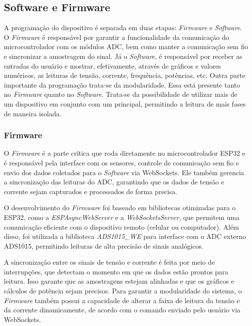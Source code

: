 \subsection{Software e Firmware}\label{softfirm}

A programação do dispositivo é separada em duas etapas: \textit{Firmware} e \textit{Software}. O \textit{Firmware} é responsável por garantir a funcionalidade da comunicação do microcontrolador com os módulos \gls{ADC}, bem como manter a comunicação sem fio e sincronizar a amostragem do sinal.
Já o \textit{Software}, é responsável por receber as entradas do usuário e mostrar, efetivamente, através de gráficos e valores numéricos, as leituras de tensão, corrente, frequência, potências, etc.
Outra parte importante da programação trata-se da modularidade. Essa está presente tanto no \textit{Firmware} quanto no \textit{Software}. Trata-se da possibilidade de utilizar mais de um dispositivo em conjunto com um principal, permitindo a leitura de mais fases de maneira isolada.

\subsubsection{Firmware}\label{firmw}

O \textit{Firmware} é a parte crítica que roda diretamente no microcontrolador ESP32 e é responsável pela interface com os sensores, controle de comunicação sem fio e envio dos dados coletados para o \textit{Software} via WebSockets. Ele também gerencia a sincronização das leituras do ADC, garantindo que os dados de tensão e corrente sejam capturados e processados de forma precisa.

O desenvolvimento do \textit{Firmware} foi baseado em bibliotecas otimizadas para o ESP32, como a \textit{ESPAsyncWebServer} e a \textit{WebSocketsServer}, que permitem uma comunicação eficiente com o dispositivo remoto (celular ou computador). Além disso, foi utilizada a biblioteca \textit{ADS1015\_WE} para interface com o ADC externo ADS1015, permitindo leituras de alta precisão de sinais analógicos.

A sincronização entre os sinais de tensão e corrente é feita por meio de interrupções, que detectam o momento em que os dados estão prontos para leitura. Isso garante que as amostragens estejam alinhadas e que os gráficos e cálculos de potência sejam precisos. Para garantir a modularidade do sistema, o \textit{Firmware} também possui a capacidade de alterar a faixa de leitura da tensão e da corrente dinamicamente, de acordo com o comando enviado pelo usuário via WebSockets.

